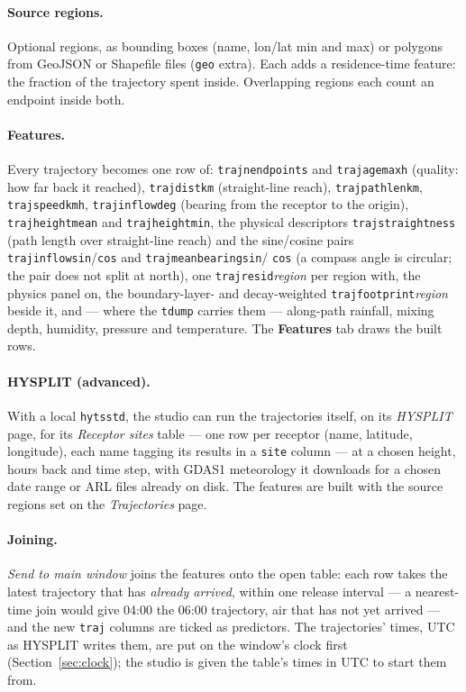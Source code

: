 \documentclass[11pt]{report}
\newcommand{\codeunderscore}{\textunderscore\allowbreak}
\newcommand{\code}[1]{\texttt{\let\_\codeunderscore #1}}
\newcommand{\tab}[1]{\textbf{#1}}
\begin{document}
\paragraph{Source regions.} Optional regions, as bounding boxes (name, lon/lat min and
max) or polygons from GeoJSON or Shapefile files (\code{geo} extra). Each adds a
residence-time feature: the fraction of the trajectory spent inside. Overlapping regions
each count an endpoint inside both.

\paragraph{Features.} Every trajectory becomes one row of: \code{traj\_n\_endpoints} and
\code{traj\_age\_max\_h} (quality: how far back it reached), \code{traj\_dist\_km}
(straight-line reach), \code{traj\_pathlen\_km}, \code{traj\_speed\_kmh},
\code{traj\_inflow\_deg} (bearing from the receptor to the origin),
\code{traj\_height\_mean} and \code{traj\_height\_min}, the physical descriptors
\code{traj\_straightness} (path length over straight-line reach) and the sine/cosine
pairs \code{traj\_inflow\_sin}/\code{\_cos} and \code{traj\_mean\_bearing\_sin}/
\code{\_cos} (a compass angle is circular; the pair does not split at north), one
\code{traj\_resid\_}\emph{region} per region with, the physics panel on, the
boundary-layer- and decay-weighted \code{traj\_footprint\_}\emph{region} beside it, and
--- where the \code{tdump} carries them --- along-path rainfall, mixing depth, humidity,
pressure and temperature. The \tab{Features} tab draws the built rows.

\paragraph{HYSPLIT (advanced).} With a local \code{hyts\_std}, the studio can run the
trajectories itself, on its \emph{HYSPLIT} page, for its \emph{Receptor sites} table ---
one row per receptor (name, latitude, longitude), each name tagging its results in a
\code{site} column --- at a chosen height, hours back and time step, with GDAS1
meteorology it downloads for a chosen date range or ARL files already on disk. The
features are built with the source regions set on the \emph{Trajectories} page.

\paragraph{Joining.} \emph{Send to main window} joins the features onto the open table:
each row takes the latest trajectory that has \emph{already arrived}, within one release
interval --- a nearest-time join would give 04:00 the 06:00 trajectory, air that has not
yet arrived --- and the new \code{traj\_*} columns are ticked as predictors. The
trajectories' times, UTC as HYSPLIT writes them, are put on the window's clock first
(Section~\ref{sec:clock}); the studio is given the table's times in UTC to start them from.
\end{document}

